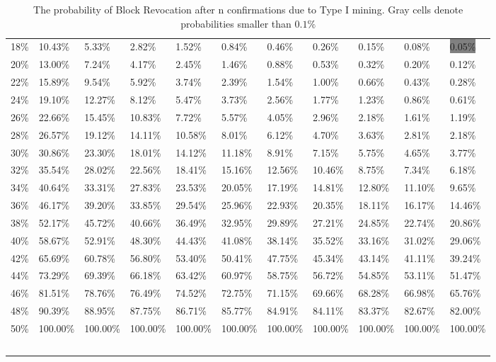 \documentclass[letterpaper,12pt]{report}
\theoremstyle{plain}
\theoremstyle{definition}
\begin{document}
\begin{table}
{\begin{tabular}{l|llllllllll}
    18\% & 10.43\% & 5.33\%  & 2.82\%  & 1.52\%  & 0.84\%  & 0.46\%  & 0.26\%  & 0.15\%  & 0.08\%  & \colorbox{gray}{0.05\%}  \\
    20\% & 13.00\% & 7.24\%  & 4.17\%  & 2.45\%  & 1.46\%  & 0.88\%  & 0.53\%  & 0.32\%  & 0.20\%  & 0.12\%  \\
    22\% & 15.89\% & 9.54\%  & 5.92\%  & 3.74\%  & 2.39\%  & 1.54\%  & 1.00\%  & 0.66\%  & 0.43\%  & 0.28\%  \\
    24\% & 19.10\% & 12.27\% & 8.12\%  & 5.47\%  & 3.73\%  & 2.56\%  & 1.77\%  & 1.23\%  & 0.86\%  & 0.61\%  \\
    26\% & 22.66\% & 15.45\% & 10.83\% & 7.72\%  & 5.57\%  & 4.05\%  & 2.96\%  & 2.18\%  & 1.61\%  & 1.19\%  \\
    28\% & 26.57\% & 19.12\% & 14.11\% & 10.58\% & 8.01\%  & 6.12\%  & 4.70\%  & 3.63\%  & 2.81\%  & 2.18\%  \\
    30\% & 30.86\% & 23.30\% & 18.01\% & 14.12\% & 11.18\% & 8.91\%  & 7.15\%  & 5.75\%  & 4.65\%  & 3.77\%  \\
    32\% & 35.54\% & 28.02\% & 22.56\% & 18.41\% & 15.16\% & 12.56\% & 10.46\% & 8.75\%  & 7.34\%  & 6.18\%  \\
    34\% & 40.64\% & 33.31\% & 27.83\% & 23.53\% & 20.05\% & 17.19\% & 14.81\% & 12.80\% & 11.10\% & 9.65\%  \\
    36\% & 46.17\% & 39.20\% & 33.85\% & 29.54\% & 25.96\% & 22.93\% & 20.35\% & 18.11\% & 16.17\% & 14.46\% \\
    38\% & 52.17\% & 45.72\% & 40.66\% & 36.49\% & 32.95\% & 29.89\% & 27.21\% & 24.85\% & 22.74\% & 20.86\% \\
    40\% & 58.67\% & 52.91\% & 48.30\% & 44.43\% & 41.08\% & 38.14\% & 35.52\% & 33.16\% & 31.02\% & 29.06\% \\
    42\% & 65.69\% & 60.78\% & 56.80\% & 53.40\% & 50.41\% & 47.75\% & 45.34\% & 43.14\% & 41.11\% & 39.24\% \\
    44\% & 73.29\% & 69.39\% & 66.18\% & 63.42\% & 60.97\% & 58.75\% & 56.72\% & 54.85\% & 53.11\% & 51.47\% \\
    46\% & 81.51\% & 78.76\% & 76.49\% & 74.52\% & 72.75\% & 71.15\% & 69.66\% & 68.28\% & 66.98\% & 65.76\% \\
    48\% & 90.39\% & 88.95\% & 87.75\% & 86.71\% & 85.77\% & 84.91\% & 84.11\% & 83.37\% & 82.67\% & 82.00\% \\
    50\% & 100.00\% & 100.00\% & 100.00\% & 100.00\% & 100.00\% & 100.00\% & 100.00\% & 100.00\% & 100.00\% & 100.00\% \\
    ~   & ~       & ~       & ~       & ~       & ~       & ~       & ~       & ~       & ~       & ~       \\
    \end{tabular}
    }
    \caption {The probability of Block Revocation after n confirmations due to Type I mining. Gray cells denote probabilities smaller than $0.1\%$}
\end{table}
\end{document}
